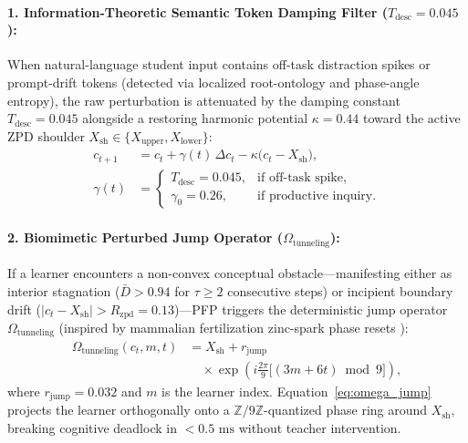 \documentclass[10pt,twocolumn,a4paper]{article}
\begin{document}
\paragraph{1. Information-Theoretic Semantic Token Damping Filter ($T_{\text{desc}} = 0.045$):}
When natural-language student input contains off-task distraction spikes or prompt-drift tokens (detected via localized root-ontology and phase-angle entropy), the raw perturbation is attenuated by the damping constant $T_{\text{desc}} = 0.045$ \cite{dagli2026werr} alongside a restoring harmonic potential $\kappa = 0.44$ toward the active ZPD shoulder $X_{\text{sh}} \in \{X_{\text{upper}}, X_{\text{lower}}\}$:
\begin{align}
    c_{t+1} &= c_t + \gamma(t)\,\Delta c_t - \kappa \big(c_t - X_{\text{sh}}\big), \label{eq:damping} \\
    \gamma(t) &= \begin{cases} 
        T_{\text{desc}} = 0.045, & \text{if off-task spike}, \\ 
        \gamma_0 = 0.26, & \text{if productive inquiry}. 
    \end{cases} \nonumber
\end{align}

\paragraph{2. Biomimetic Perturbed Jump Operator ($\Omega_{\text{tunneling}}$):}
If a learner encounters a non-convex conceptual obstacle---manifesting either as interior stagnation ($\bar{D} > 0.94$ for $\tau \ge 2$ consecutive steps) or incipient boundary drift ($|c_t - X_{\text{sh}}| > R_{\text{zpd}} = 0.13$)---PFP triggers the deterministic jump operator $\Omega_{\text{tunneling}}$ (inspired by mammalian fertilization zinc-spark phase resets \cite{dagli2026oed}):
\begin{equation}
\begin{split}
    \Omega_{\text{tunneling}}(c_t, m, t) &= X_{\text{sh}} + r_{\text{jump}} \\
    &\quad \times \exp\!\left(i \frac{2\pi}{9} \big[(3m + 6t) \bmod 9\big]\right),
\end{split}
\label{eq:omega_jump}
\end{equation}
where $r_{\text{jump}} = 0.032$ and $m$ is the learner index. Equation~\eqref{eq:omega_jump} projects the learner orthogonally onto a $\mathbb{Z}/9\mathbb{Z}$-quantized phase ring around $X_{\text{sh}}$, breaking cognitive deadlock in $< 0.5\text{ ms}$ without teacher intervention.
\end{document}
